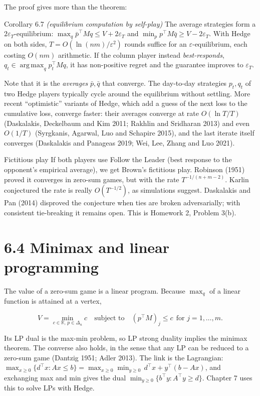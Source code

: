\documentclass[11pt,a4paper,openany]{book}
\newcommand{\R}{\mathbb{R}}
\newcommand{\eps}{\varepsilon}
\DeclareMathOperator*{\argmax}{arg\,max}
\newcommand{\simplex}{\Delta}
\begin{document}
The proof gives more than the theorem:

\begin{bthm}{Corollary 6.7 \emph{(equilibrium computation by self-play)}}
The average strategies form a $2\eps_T$-equilibrium: $\max_q\bar p^\top Mq\le V+2\eps_T$ and $\min_pp^\top M\bar q\ge V-2\eps_T$. With Hedge on both sides, $T=O(\ln(nm)/\eps^2)$ rounds suffice for an $\eps$-equilibrium, each costing $O(nm)$ arithmetic. If the column player instead \emph{best-responds}, $q_t\in\argmax_qp_t^\top Mq$, it has non-positive regret and the guarantee improves to $\eps_T$.
\end{bthm}

Note that it is the \emph{averages} $\bar p,\bar q$ that converge. The day-to-day strategies $p_t,q_t$ of two Hedge players typically cycle around the equilibrium without settling. More recent ``optimistic'' variants of Hedge, which add a guess of the next loss to the cumulative loss, converge faster: their averages converge at rate $O(\ln T/T)$ (Daskalakis, Deckelbaum and Kim 2011; Rakhlin and Sridharan 2013) and even $O(1/T)$ (Syrgkanis, Agarwal, Luo and Schapire 2015), and the last iterate itself converges (Daskalakis and Panageas 2019; Wei, Lee, Zhang and Luo 2021).

\begin{bwarn}{Fictitious play}
If both players use Follow the Leader (best response to the opponent's empirical average), we get Brown's fictitious play. Robinson (1951) proved it converges in zero-sum games, but with the rate $T^{-1/(n+m-2)}$. Karlin conjectured the rate is really $O(T^{-1/2})$, as simulations suggest. Daskalakis and Pan (2014) disproved the conjecture when ties are broken adversarially; with consistent tie-breaking it remains open. This is Homework 2, Problem 3(b).
\end{bwarn}

\section*{6.4 Minimax and linear programming}\label{ch6-lp}

The value of a zero-sum game is a linear program. Because $\max_q$ of a linear function is attained at a vertex,

\[V=\min_{c\in\R,\,p\in\simplex_n}c\quad\text{subject to}\quad(p^\top M)_j\le c\ \ \text{for } j=1,\dots,m.\]

Its LP dual is the max-min problem, so LP strong duality implies the minimax theorem. The converse also holds, in the sense that any LP can be reduced to a zero-sum game (Dantzig 1951; Adler 2013). The link is the Lagrangian: $\max_{x\ge0}\{d^\top x:Ax\le b\}=\max_{x\ge0}\min_{y\ge0}\,d^\top x+y^\top(b-Ax)$, and exchanging max and min gives the dual $\min_{y\ge0}\{b^\top y:A^\top y\ge d\}$. Chapter 7 uses this to solve LPs with Hedge.
\end{document}
